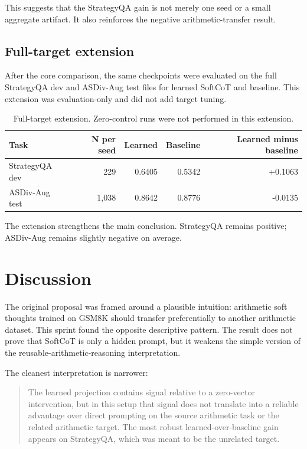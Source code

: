 \documentclass{article}
\begin{document}
This suggests that the StrategyQA gain is not merely one seed or a small aggregate artifact. It also reinforces the negative arithmetic-transfer result.

\subsection{Full-target extension}

After the core comparison, the same checkpoints were evaluated on the full StrategyQA dev and ASDiv-Aug test files for learned SoftCoT and baseline. This extension was evaluation-only and did not add target tuning.

\begin{table}[h]
\centering
\caption{Full-target extension. Zero-control runs were not performed in this extension.}
\label{tab:full}
\begin{tabular}{lrrrr}
\toprule
Task & N per seed & Learned & Baseline & Learned minus baseline \\
\midrule
StrategyQA dev & 229 & 0.6405 & 0.5342 & +0.1063 \\
ASDiv-Aug test & 1,038 & 0.8642 & 0.8776 & -0.0135 \\
\bottomrule
\end{tabular}
\end{table}

The extension strengthens the main conclusion. StrategyQA remains positive; ASDiv-Aug remains slightly negative on average.

\section{Discussion}

The original proposal was framed around a plausible intuition: arithmetic soft thoughts trained on GSM8K should transfer preferentially to another arithmetic dataset. This sprint found the opposite descriptive pattern. The result does not prove that SoftCoT is only a hidden prompt, but it weakens the simple version of the reusable-arithmetic-reasoning interpretation.

The cleanest interpretation is narrower:

\begin{quote}
The learned projection contains signal relative to a zero-vector intervention, but in this setup that signal does not translate into a reliable advantage over direct prompting on the source arithmetic task or the related arithmetic target. The most robust learned-over-baseline gain appears on StrategyQA, which was meant to be the unrelated target.
\end{quote}
\end{document}
